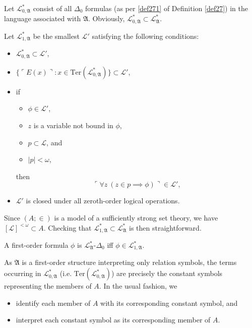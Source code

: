 \documentclass[12pt]{article}
\numberwithin{equation}{section}
\begin{document}
\begin{defi}\label{lsub}
Let $\mathcal{L}^{*}_{0, \mathfrak{A}}$ consist of all $\Delta_0$ formulas (as per \ref{def271} of Definition \ref{def27}) in the language associated with $\mathfrak{A}$. Obviously, $\mathcal{L}^{*}_{0, \mathfrak{A}} \subset \mathcal{L}^{*}_{\mathfrak{A}}$.

Let $\mathcal{L}^{*}_{1, \mathfrak{A}}$ be the smallest $\mathcal{L}'$ satisfying the following conditions:
\begin{itemize}
    \item $\mathcal{L}^{*}_{0, \mathfrak{A}} \subset \mathcal{L}'$,
    \item $\{\ulcorner E(x) \urcorner : x \in \mathrm{Ter}(\mathcal{L}^{*}_{0, \mathfrak{A}})\} \subset \mathcal{L}'$,
    \item if 
    \begin{itemize}[label=$\circ$]
        \item $\phi \in \mathcal{L}'$,
        \item $z$ is a variable not bound in $\phi$,
        \item $p \subset \mathcal{L}$, and
        \item $|p| < \omega$,
    \end{itemize} 
    then $$\ulcorner \forall z \ (z \in p \implies \phi) \urcorner \in \mathcal{L}',$$
    \item $\mathcal{L}'$ is closed under all zeroth-order logical operations.
\end{itemize}
Since $(A; \in)$ is a model of a sufficiently strong set theory, we have $[\mathcal{L}]^{< \omega} \subset A$. Checking that $\mathcal{L}^{*}_{1, \mathfrak{A}} \subset \mathcal{L}^{*}_{\mathfrak{A}}$ is then straightforward. 

A first-order formula $\phi$ is $\mathcal{L}^{*}_{\mathfrak{A}}$-$\Delta_0$ iff $\phi \in \mathcal{L}^{*}_{1, \mathfrak{A}}$. 
\end{defi}

\begin{rem}
As $\mathfrak{A}$ is a first-order structure interpreting only relation symbols, the terms occurring in $\mathcal{L}^{*}_{0, \mathfrak{A}}$ (i.e. $\mathrm{Ter}(\mathcal{L}^{*}_{0, \mathfrak{A}})$) are precisely the constant symbols representing the members of $A$. In the usual fashion, we 
\begin{itemize}
    \item identify each member of $A$ with its corresponding constant symbol, and
    \item interpret each constant symbol as its corresponding member of $A$.
\end{itemize}
\end{rem}
\end{document}
